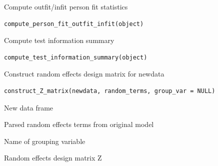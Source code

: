 \documentclass[a4paper]{book}
\begin{document}
%
\begin{Description}
Compute outfit/infit person fit statistics
\end{Description}
%
\begin{Usage}
\begin{verbatim}
compute_person_fit_outfit_infit(object)
\end{verbatim}
\end{Usage}
%
\begin{Description}
Compute test information summary
\end{Description}
%
\begin{Usage}
\begin{verbatim}
compute_test_information_summary(object)
\end{verbatim}
\end{Usage}
%
\begin{Description}
Construct random effects design matrix for newdata
\end{Description}
%
\begin{Usage}
\begin{verbatim}
construct_Z_matrix(newdata, random_terms, group_var = NULL)
\end{verbatim}
\end{Usage}
%
\begin{Arguments}
\begin{ldescription}
\item[\code{newdata}] New data frame

\item[\code{random\_terms}] Parsed random effects terms from original model

\item[\code{group\_var}] Name of grouping variable
\end{ldescription}
\end{Arguments}
%
\begin{Value}
Random effects design matrix Z
\end{Value}
\end{document}
